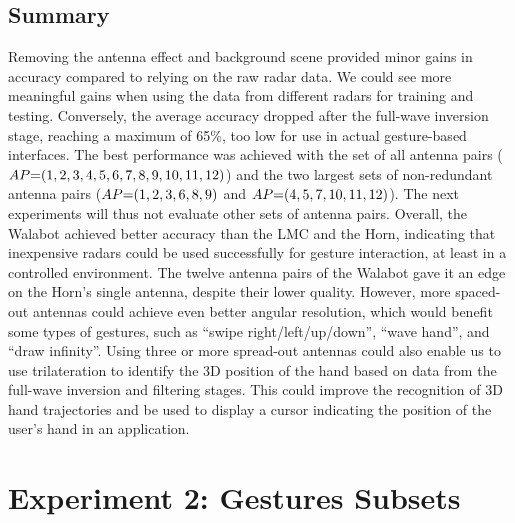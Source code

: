 \subsection{Summary}  \label{sec:radar-experiments:sensors:discussion}
Removing the antenna effect and background scene provided minor gains in accuracy compared to relying on the raw radar data. We could see more meaningful gains when using the data from different radars for training and testing.
%
Conversely, the average accuracy dropped after the full-wave inversion stage, reaching a maximum of 65\%, too low for use in actual gesture-based interfaces. 
%
The best performance was achieved with the set of all antenna pairs ($\splitatcommas{AP{=}(1, 2, 3, 4, 5, 6, 7, 8, 9, 10, 11, 12)}$) and the two largest sets of non-redundant antenna pairs ($\splitatcommas{AP{=}(1, 2, 3, 6, 8, 9)}$ and $\splitatcommas{AP{=}(4, 5, 7, 10, 11, 12)}$). The next experiments will thus not evaluate other sets of antenna pairs.
Overall, the Walabot achieved better accuracy than the LMC and the Horn, indicating that inexpensive radars could be used successfully for gesture interaction, at least in a controlled environment. 
The twelve antenna pairs of the Walabot gave it an edge on the Horn's single antenna, despite their lower quality. However, more spaced-out antennas could achieve even better angular resolution, which would benefit some types of gestures, such as ``swipe right/left/up/down'', ``wave hand'', and ``draw infinity''.
%
Using three or more spread-out antennas could also enable us to use trilateration to identify the 3D position of the hand based on data from the full-wave inversion and filtering stages. This could improve the recognition of 3D hand trajectories and be used to display a cursor indicating the position of the user's hand in an application.



\section{Experiment 2: Gestures Subsets} \label{sec:radar-experiments:gesture-subsets}
